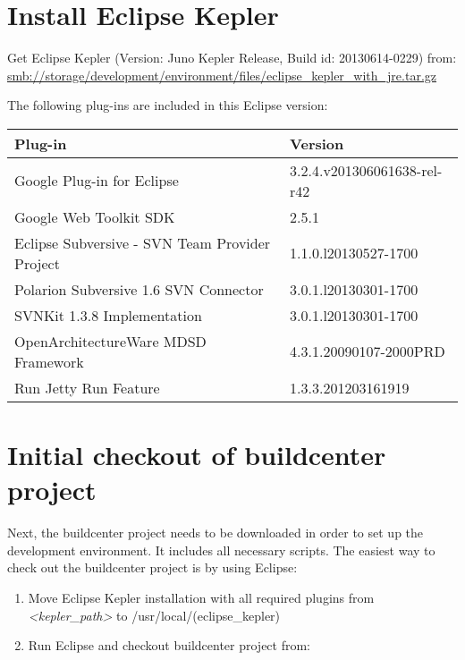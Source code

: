 \documentclass[10pt,a4paper]{article}
\begin{document}
\newpage
\section{Install Eclipse Kepler}
Get Eclipse Kepler (Version: Juno Kepler Release, Build id: 20130614-0229) from:
\newline
\href{smb://storage/development/environment/files/eclipse_kepler_with_jre.tar.gz}{smb://storage/development/environment/files/eclipse\_kepler\_with\_jre.tar.gz}

\vspace{\baselineskip}
\noindent
The following plug-ins are included in this Eclipse version:
\begin{table}[h!tp]
\begin{center}
\begin{tabular}{|l|l|} 

\hline
\textbf{Plug-in} & \textbf{Version} \\
\hline
\hline
Google Plug-in for Eclipse & 3.2.4.v201306061638-rel-r42  \\
Google Web Toolkit SDK & 2.5.1  \\
\hline
Eclipse Subversive - SVN Team Provider Project & 1.1.0.l20130527-1700  \\
Polarion Subversive 1.6 SVN Connector & 3.0.1.l20130301-1700  \\
SVNKit 1.3.8 Implementation & 3.0.1.l20130301-1700  \\
\hline
OpenArchitectureWare MDSD Framework & 4.3.1.20090107-2000PRD \\
\hline
Run Jetty Run Feature & 1.3.3.201203161919 \\
\hline
\end{tabular}
\end{center}
\end{table}

\newpage
\section{Initial checkout of buildcenter project}
Next, the buildcenter project needs to be downloaded in order to set up the development environment. It includes all necessary scripts. The easiest way to check out the buildcenter project is by using Eclipse:
\begin{enumerate}
 \item{}Move Eclipse Kepler installation with all required plugins from \textit{<kepler\_path>} to /usr/local/(eclipse\_kepler)
 \item{}Run Eclipse and checkout buildcenter project from:
\end{enumerate}
\end{document}
